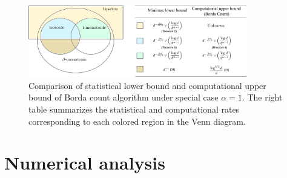 \documentclass[12pt]{article}
\theoremstyle{definition}
\begin{document}
\begin{figure}[h]
    \centering
    \includegraphics[width = 0.85\textwidth]{figure/Venn.pdf}
    \caption{\color{blue}Comparison of statistical lower bound and computational upper bound of Borda count algorithm under special case $\alpha=1$. The right table summarizes the statistical and computational rates corresponding to each colored region in the Venn diagram.}
    \label{fig:venn}
\end{figure}



\section{Numerical analysis}\label{sec:sim}
\end{document}
